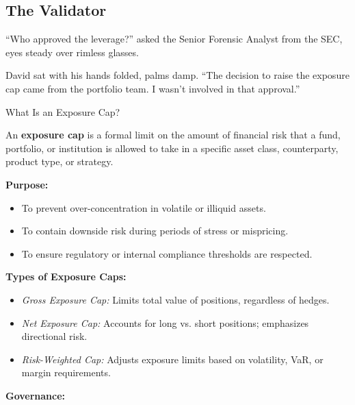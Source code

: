 \medskip

\subsection{The Validator}

``Who approved the leverage?'' asked the Senior Forensic Analyst from the SEC, eyes steady 
over rimless glasses.

David sat with his hands folded, palms damp. ``The decision to raise the exposure cap came 
from the portfolio team.  I wasn’t involved in that approval.''

\medskip

\begin{TechnicalSidebar}{What Is an Exposure Cap?}

  An \textbf{exposure cap} is a formal limit on the amount of financial risk that a fund, portfolio, or 
  institution is allowed to take in a specific asset class, counterparty, product type, or strategy.

  \medskip
  
  \textbf{Purpose:}

  \medskip

  \begin{itemize}
    \item To prevent over-concentration in volatile or illiquid assets.
    \item To contain downside risk during periods of stress or mispricing.
    \item To ensure regulatory or internal compliance thresholds are respected.
  \end{itemize}
  
  \medskip

  \textbf{Types of Exposure Caps:}

  \medskip

  \begin{itemize}
    \item \textit{Gross Exposure Cap:} Limits total value of positions, regardless of hedges.
    \item \textit{Net Exposure Cap:} Accounts for long vs. short positions; emphasizes directional risk.
    \item \textit{Risk-Weighted Cap:} Adjusts exposure limits based on volatility, VaR, or margin 
    requirements.
  \end{itemize}
  
  \medskip

  \textbf{Governance:}


\end{TechnicalSidebar}
